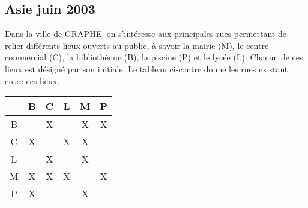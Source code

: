 \vfill\newpage
\subsection{Asie juin 2003 }\label{asj03} 


\bigskip 
\begin{minipage}[l]{0,58\textwidth}
Dans la ville de GRAPHE, on s'intéresse aux principales rues permettant de relier différents lieux ouverts au public, à savoir la mairie (M), le centre commercial (C), la bibliothèque (B), la piscine (P) et le lycée (L). Chacun de ces lieux est désigné par son initiale. Le tableau ci-contre donne les rues existant entre ces lieux.
\end{minipage}\hfill
\begin{minipage}[]{0,38\textwidth}
\begin{center}
     \begin{tabular}{|*{5}{c|} c|} \cline{2-6}
        \multicolumn{1}{c|}{}
          & B   & C & L & M & P \\ \hline
        B &     & X &   & X & X \\ \hline
        C & X   &   & X & X &   \\ \hline
        L &     & X &   & X &   \\ \hline
        M & X   & X & X &   & X \\ \hline
        P & X   &   &   & X &   \\ \hline
    \end{tabular}
\end{center}
\end{minipage}

